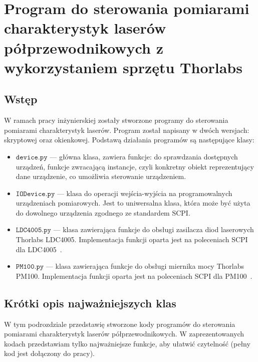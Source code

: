 \chapter{Program do sterowania pomiarami charakterystyk laserów półprzewodnikowych z wykorzystaniem sprzętu Thorlabs}
\section{Wstęp}
W ramach pracy inżynierskiej zostały stworzone programy do sterowania pomiarami charakterystyk laserów.
Program został napisany w dwóch wersjach: skryptowej oraz okienkowej. Podstawą działania programów są następujące klasy:
\begin{itemize}
\item $\mathtt{device.py}$ --- główna klasa, zawiera funkcje: do sprawdzania dostępnych urządzeń,
funkcje zwracającą instancje, czyli konkretny obiekt reprezentujący dane urządzenie, co umożliwia sterowanie urządzeniem.
\item $\mathtt{IODevice.py}$ --- klasa do operacji wejścia-wyjścia na programowalnych urządzeniach pomiarowych. Jest to
uniwersalna klasa, która może być użyta do dowolnego urządzenia zgodnego ze standardem SCPI.
\item $\mathtt{LDC4005.py}$ --- klasa zawierająca funkcje do obsługi zasilacza diod laserowych Thorlabs LDC4005. Implementacja
funkcji oparta jest na poleceniach SCPI dla LDC4005~\cite{Ldc_book_prog}.
\item $\mathtt{PM100.py}$ --- klasa zawierająca funkcje do obsługi miernika mocy Thorlabs PM100. Implementacja
funkcji oparta jest na poleceniach SCPI dla PM100~\cite{Pm100_book}.
\end{itemize}
\section{Krótki opis najważniejszych klas}
W tym podrozdziale przedstawię stworzone kody programów do sterowania pomiarami charakterystyk laserów półprzewodnikowych.
W zaprezentowanych kodach przedstawiam tylko najważniejsze funkcje, aby ułatwić czytelność (pełny kod jest dołączony do pracy).

